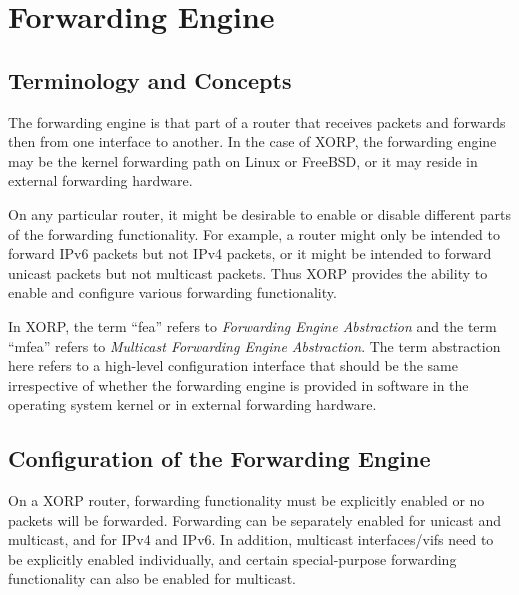 %
%

\chapter{Forwarding Engine}

\section{Terminology and Concepts}

The forwarding engine is that part of a router that receives packets
and forwards then from one interface to another.  In the case of XORP,
the forwarding engine may be the kernel forwarding path on Linux or
FreeBSD, or it may reside in external forwarding hardware.  

On any particular router, it might be desirable to enable or disable
different parts of the forwarding functionality.  For example, a
router might only be intended to forward IPv6 packets but not IPv4
packets, or it might be intended to forward unicast packets but not
multicast packets.    Thus XORP provides the ability to enable and
configure various forwarding functionality.

In XORP, the term ``{\stt fea}'' refers to {\it Forwarding Engine
Abstraction} and the term ``{\stt mfea}'' refers to {\it Multicast
Forwarding Engine Abstraction}.  The term abstraction here refers to a
high-level configuration interface that should be the same
irrespective of whether the forwarding engine is provided in software
in the operating system kernel or in external forwarding hardware.

\newpage
\section{Configuration of the Forwarding Engine}

On a XORP router, forwarding functionality must be explicitly enabled
or no packets will be forwarded.  Forwarding can be separately enabled
for unicast and multicast, and for IPv4 and IPv6.  In addition,
multicast interfaces/vifs need to be explicitly enabled individually,
and certain special-purpose forwarding functionality can also be
enabled for multicast.

